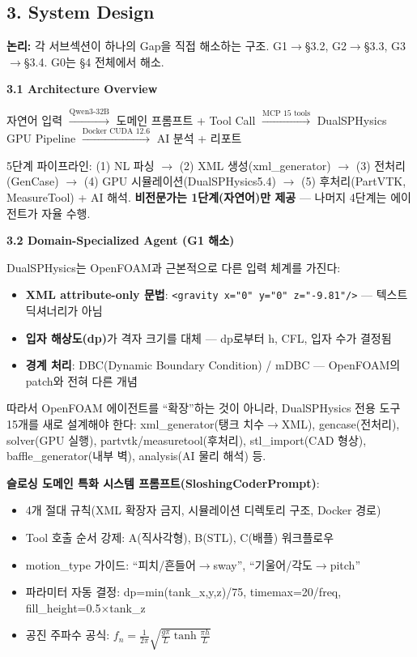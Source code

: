 \documentclass[12pt,a4paper]{article}
\begin{document}
\subsection{3. System Design}

\textbf{논리:} 각 서브섹션이 하나의 Gap을 직접 해소하는 구조.
G1$\rightarrow$§3.2, G2$\rightarrow$§3.3, G3$\rightarrow$§3.4.
G0는 §4 전체에서 해소.

\textbf{3.1 Architecture Overview}

\begin{center}
\small
자연어 입력 $\xrightarrow{\text{Qwen3-32B}}$
도메인 프롬프트 + Tool Call $\xrightarrow{\text{MCP 15 tools}}$
DualSPHysics GPU Pipeline $\xrightarrow{\text{Docker CUDA 12.6}}$
AI 분석 + 리포트
\end{center}

5단계 파이프라인:
(1) NL 파싱 $\rightarrow$ (2) XML 생성(xml\_generator) $\rightarrow$
(3) 전처리(GenCase) $\rightarrow$ (4) GPU 시뮬레이션(DualSPHysics5.4) $\rightarrow$
(5) 후처리(PartVTK, MeasureTool) + AI 해석.
\textbf{비전문가는 1단계(자연어)만 제공} --- 나머지 4단계는 에이전트가 자율 수행.

\textbf{3.2 Domain-Specialized Agent (G1 해소)}

DualSPHysics는 OpenFOAM과 근본적으로 다른 입력 체계를 가진다:
\begin{itemize}[nosep]
\item \textbf{XML attribute-only 문법}: \texttt{<gravity x="0" y="0" z="-9.81"/>} --- 텍스트 딕셔너리가 아님
\item \textbf{입자 해상도(dp)}가 격자 크기를 대체 --- dp로부터 h, CFL, 입자 수가 결정됨
\item \textbf{경계 처리}: DBC(Dynamic Boundary Condition) / mDBC --- OpenFOAM의 patch와 전혀 다른 개념
\end{itemize}

따라서 OpenFOAM 에이전트를 ``확장''하는 것이 아니라,
DualSPHysics 전용 도구 15개를 새로 설계해야 한다:
xml\_generator(탱크 치수$\rightarrow$XML), gencase(전처리), solver(GPU 실행),
partvtk/measuretool(후처리), stl\_import(CAD 형상),
baffle\_generator(내부 벽), analysis(AI 물리 해석) 등.

\textbf{슬로싱 도메인 특화 시스템 프롬프트(SloshingCoderPrompt)}:
\begin{itemize}[nosep]
\item 4개 절대 규칙(XML 확장자 금지, 시뮬레이션 디렉토리 구조, Docker 경로)
\item Tool 호출 순서 강제: A(직사각형), B(STL), C(배플) 워크플로우
\item motion\_type 가이드: ``피치/흔들어$\rightarrow$sway'', ``기울어/각도$\rightarrow$pitch''
\item 파라미터 자동 결정: dp=min(tank\_x,y,z)/75, timemax=20/freq, fill\_height=0.5$\times$tank\_z
\item 공진 주파수 공식: $f_n = \frac{1}{2\pi}\sqrt{\frac{g\pi}{L}\tanh\frac{\pi h}{L}}$
\end{itemize}
\end{document}
